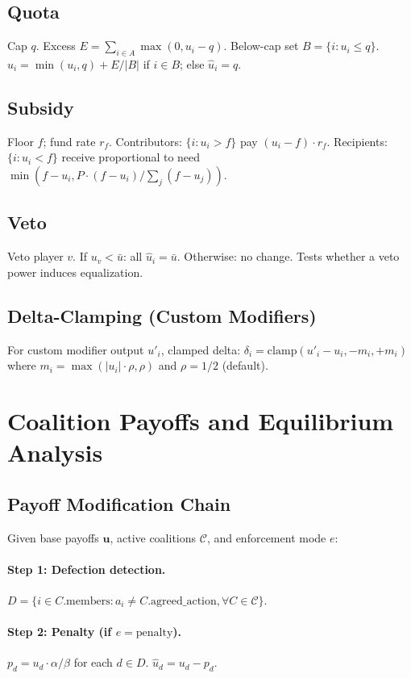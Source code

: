 \subsection{Quota}
Cap $q$. Excess $E = \sum_{i \in A} \max(0, u_i - q)$.
Below-cap set $B = \{i : u_i \leq q\}$.
$\hat{u}_i = \min(u_i, q) + E/|B|$ if $i \in B$; else $\hat{u}_i = q$.

\subsection{Subsidy}
Floor $f$; fund rate $r_f$.
Contributors: $\{i : u_i > f\}$ pay $(u_i - f) \cdot r_f$.
Recipients: $\{i : u_i < f\}$ receive proportional to need
$\min(f - u_i, P \cdot (f-u_i)/\sum_j(f-u_j))$.

\subsection{Veto}
Veto player $v$. If $u_v < \bar{u}$: all $\hat{u}_i = \bar{u}$.
Otherwise: no change. Tests whether a veto power induces equalization.

\subsection{Delta-Clamping (Custom Modifiers)}
For custom modifier output $u'_i$, clamped delta:
$\delta_i = \text{clamp}(u'_i - u_i, -m_i, +m_i)$ where
$m_i = \max(|u_i| \cdot \rho, \rho)$ and $\rho = 1/2$ (default).

\section{Coalition Payoffs and Equilibrium Analysis}
\label{app:coalition-formal}

\subsection{Payoff Modification Chain}
Given base payoffs $\mathbf{u}$, active coalitions $\mathcal{C}$,
and enforcement mode $e$:

\paragraph{Step 1: Defection detection.}
$D = \{i \in C.\text{members} : a_i \neq C.\text{agreed\_action},
\forall C \in \mathcal{C}\}$.

\paragraph{Step 2: Penalty (if $e = \text{penalty}$).}
$p_d = u_d \cdot \alpha/\beta$ for each $d \in D$.
$\hat{u}_d = u_d - p_d$.

